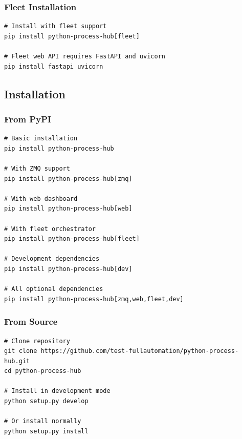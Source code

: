 \subsubsection{Fleet Installation}

\begin{verbatim}
# Install with fleet support
pip install python-process-hub[fleet]

# Fleet web API requires FastAPI and uvicorn
pip install fastapi uvicorn
\end{verbatim}

\subsection{Installation}

\subsubsection{From PyPI}

\begin{verbatim}
# Basic installation
pip install python-process-hub

# With ZMQ support
pip install python-process-hub[zmq]

# With web dashboard
pip install python-process-hub[web]

# With fleet orchestrator
pip install python-process-hub[fleet]

# Development dependencies
pip install python-process-hub[dev]

# All optional dependencies
pip install python-process-hub[zmq,web,fleet,dev]
\end{verbatim}

\subsubsection{From Source}

\begin{verbatim}
# Clone repository
git clone https://github.com/test-fullautomation/python-process-hub.git
cd python-process-hub

# Install in development mode
python setup.py develop

# Or install normally
python setup.py install
\end{verbatim}


